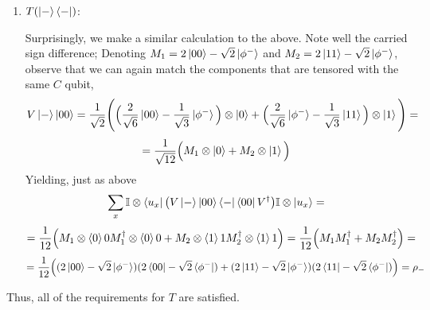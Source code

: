 \documentclass[12pt]{article}
\begin{document}
\begin{enumerate}
\begin{enumerate}
    \item $T(\ket{-}\bra{-})$:

Surprisingly, we make a similar calculation to the above. Note well the carried sign difference; Denoting $M_1 = 2\ket{00} - \sqrt{2} \ket{\phi^-}$ and $M_2 = 2\ket{11} - \sqrt{2} \ket{\phi^-}$, observe that we can again match the components that are tensored with the same $C$ qubit,
$$ V\ket{-}\ket{00} = \frac{1}{\sqrt{2}} \Bigg( \Big(\frac{2}{\sqrt{6}}\ket{00} - \frac{1}{\sqrt{3}}\ket{\phi^-}  \Big) \otimes \ket{0} + \Big(\frac{2}{\sqrt{6}}\ket{\phi^-} - \frac{1}{\sqrt{3}}\ket{11} \Big) \otimes \ket{1} \Bigg) = $$
$$ = \frac{1}{\sqrt{12}} \Big( M_1 \otimes \ket{0} + M_2 \otimes \ket{1} \Big)$$
Yielding, just as above
$$ 
\sum_x \mathbb{I}\otimes \bra{u_x} \big(V \ket{-}\ket{00}\bra{-}\bra{00} V^\dagger \big)\mathbb{I}\otimes \ket{u_x} = $$
$$= \frac{1}{12} \Big( M_1 \otimes \braket{0}{0} M_1^\dagger \otimes \braket{0}{0} + M_2 \otimes \braket{1}{1} M_2^\dagger \otimes \braket{1}{1} \Big) = \frac{1}{12} \Big( M_1M_1^\dagger + M_2M_2^\dagger\Big) = 
$$
$$ = \frac{1}{12}\Big((2\ket{00} - \sqrt{2} \ket{\phi^-})(2\bra{00} - \sqrt{2} \bra{\phi^-}) + (2\ket{11} - \sqrt{2} \ket{\phi^-})(2\bra{11} - \sqrt{2} \bra{\phi^-})\Big) = \rho_-$$
\end{enumerate}
Thus, all of the requirements for $T$ are satisfied.

\end{enumerate}
\end{document}
